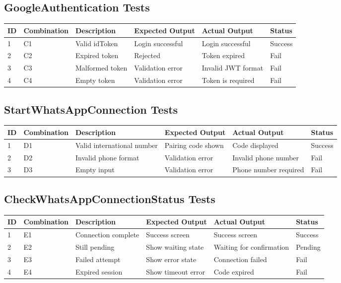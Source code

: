 \subsection*{GoogleAuthentication Tests}

\begin{longtable}{|p{1cm}|p{2cm}|p{3.2cm}|p{2.5cm}|p{3cm}|p{1.5cm}|}
\hline
\textbf{ID} & \textbf{Combination} & \textbf{Description} & \textbf{Expected Output} & \textbf{Actual Output} & \textbf{Status} \\
\hline
1 & C1 & Valid idToken & Login successful & Login successful & Success \\
\hline
2 & C2 & Expired token & Rejected & Token expired & Fail \\
\hline
3 & C3 & Malformed token & Validation error & Invalid JWT format & Fail \\
\hline
4 & C4 & Empty token & Validation error & Token is required & Fail \\
\hline
\end{longtable}

\subsection*{StartWhatsAppConnection Tests}

\begin{longtable}{|p{1cm}|p{2cm}|p{3.5cm}|p{2.5cm}|p{2.5cm}|p{1.5cm}|}
\hline
\textbf{ID} & \textbf{Combination} & \textbf{Description} & \textbf{Expected Output} & \textbf{Actual Output} & \textbf{Status} \\
\hline
1 & D1 & Valid international number & Pairing code shown & Code displayed & Success \\
\hline
2 & D2 & Invalid phone format & Validation error & Invalid phone number & Fail \\
\hline
3 & D3 & Empty input & Validation error & Phone number required & Fail \\
\hline
\end{longtable}

\subsection*{CheckWhatsAppConnectionStatus Tests}

\begin{longtable}{|p{1cm}|p{2cm}|p{3.8cm}|p{2.5cm}|p{2.5cm}|p{1.5cm}|}
\hline
\textbf{ID} & \textbf{Combination} & \textbf{Description} & \textbf{Expected Output} & \textbf{Actual Output} & \textbf{Status} \\
\hline
1 & E1 & Connection complete & Success screen & Success screen & Success \\
\hline
2 & E2 & Still pending & Show waiting state & Waiting for confirmation & Pending \\
\hline
3 & E3 & Failed attempt & Show error state & Connection failed & Fail \\
\hline
4 & E4 & Expired session & Show timeout error & Code expired & Fail \\
\hline
\end{longtable}

